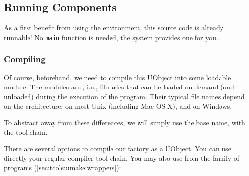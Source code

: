 \subsection{Running Components}
%


As a first benefit from using the \urbi environment, this source code
is already runnable!  No \lstinline|main| function is needed, the
\urbi system provides one for you.

\subsubsection{Compiling}
Of course, beforehand, we need to compile this UObject into some
loadable module.  The \urbi modules are , i.e.,
libraries that can be loaded on demand (and unloaded) during the
execution of the program.  Their typical file names depend on the
architecture:  on most Unix (including Mac OS X),
and  on Windows.

To abstract away from these differences, we will simply use the base
name,  with the \urbi tool chain.

There are several options to compile our factory as a UObject.  You
can use directly your regular compiler tool chain.  You may also use
 from the  family of programs
(\autoref{sec:tools:umake:wrappers}):


